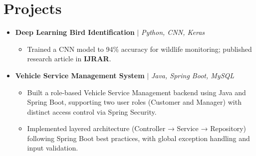 \documentclass[a4paper,10pt]{article}
\newcommand{\resumeItem}[1]{\item\small{#1 \vspace{-1pt}}}
\begin{document}
\section{Projects}
\begin{itemize}[leftmargin=*]
    \item \textbf{Deep Learning Bird Identification} $|$ \textit{Python, CNN, Keras}
    \begin{itemize}[leftmargin=1.5em]
        \resumeItem{Trained a CNN model to 94\% accuracy for wildlife monitoring; published research article in \textbf{IJRAR}.}
    \end{itemize}
    \item \textbf{Vehicle Service Management System} $|$ \textit{Java, Spring Boot, MySQL}
    \begin{itemize}[leftmargin=1.5em]
        \resumeItem{Built a role-based Vehicle Service Management backend using Java and Spring Boot, supporting two user roles (Customer and Manager) with distinct access control via Spring Security.}
        \resumeItem{Implemented layered architecture (Controller → Service → Repository) following Spring Boot best practices, with global exception handling and input validation.}
    \end{itemize}

\end{itemize}
\end{document}
